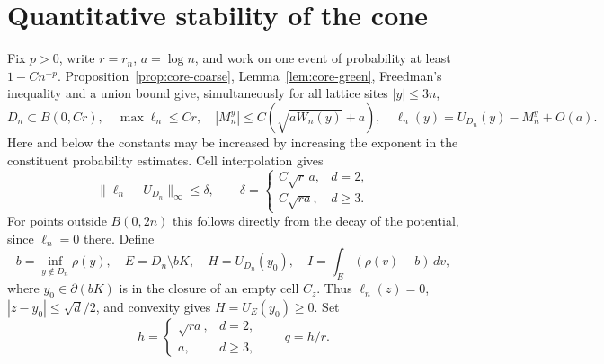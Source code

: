 \section{Quantitative stability of the cone}

Fix $p>0$, write $r=r_n$, $a=\log n$, and work on one event of
probability at least $1-Cn^{-p}$. Proposition~\ref{prop:core-coarse},
Lemma~\ref{lem:core-green}, Freedman's inequality and a union bound give,
simultaneously for all lattice sites $|y|\le3n$,
\begin{equation}\label{eq:rate-event}
 D_n\subset B(0,Cr),\quad \max\ell_n\le Cr,\quad
 |M_n^y|\le C(\sqrt{aW_n(y)}+a),\quad
 \ell_n(y)=U_{D_n}(y)-M_n^y+O(a).
\end{equation}
Here and below the constants may be increased by increasing the exponent
in the constituent probability estimates. Cell interpolation gives
\begin{equation}\label{eq:rate-crude}
 \|\ell_n-U_{D_n}\|_\infty\le\delta,
 \qquad \delta=
 \begin{cases}C\sqrt r\,a,&d=2,\\ C\sqrt{ra},&d\ge3.
 \end{cases}
\end{equation}
For points outside $B(0,2n)$ this follows directly from the decay of the
potential, since $\ell_n=0$ there. Define
\[
 b=\inf_{y\notin D_n}\rho(y),\quad E=D_n\setminus bK,
 \quad H=U_{D_n}(y_0),\quad I=\int_E(\rho(v)-b)\,dv,
\]
where $y_0\in\partial(bK)$ is in the closure of an empty cell $C_z$.
Thus $\ell_n(z)=0$, $|z-y_0|\le\sqrt d/2$, and convexity gives
$H=U_E(y_0)\ge0$. Set
\begin{equation}\label{eq:rate-hq}
 h=\begin{cases}\sqrt{ra},&d=2,\\a,&d\ge3,\end{cases}
 \qquad q=h/r.
\end{equation}

